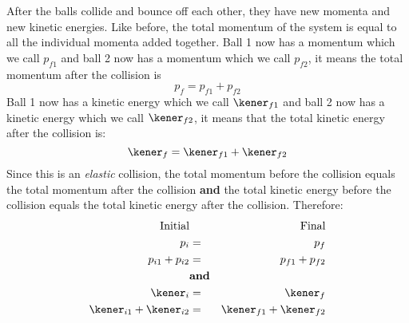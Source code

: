 After the balls collide and bounce off each other, they have new momenta and new kinetic energies. Like before, the total momentum of the system is equal to all the individual momenta added together. Ball 1 now has a momentum
which we call $p_{f1}$ and ball 2 now has a momentum which we call $p_{f2}$, it means the total momentum after the collision is
\begin{equation*}
\label{eq:pc:types:elast:after:P}
p_{f} = p_{f1}+p_{f2}
\end{equation*}
Ball 1 now has a kinetic energy which we call $\kener_{f1}$ and ball 2 now has a kinetic energy which we call $\kener_{f2}$, it means that the total kinetic energy after the collision is:
\begin{equation*}
\label{eq:pc:types:elast:after:K}
\kener_{f} = \kener_{f1}+\kener_{f2}
\end{equation*}
Since this is an \emph{elastic} collision, the total momentum before the collision equals the total momentum after the collision \textbf{and} the total kinetic energy before the collision equals the total kinetic energy after the collision. Therefore:
\begin{eqnarray*}
\nonumber
\mbox{Initial}&&\mbox{Final}\\
\label{eq:pc:types:elast:conserveP}
p_{i} &=& p_{f}\\\nonumber
p_{i1}+p_{i2} &=& p_{f1}+p_{f2} \\\nonumber
&\rm{\textbf{and}}&\\
\label{eq:pc:types:elast:conserveK}
\kener_{i} &=& \kener_{f} \\\nonumber
\kener_{i1}+\kener_{i2} &=& \kener_{f1}+\kener_{f2}
\end{eqnarray*}

